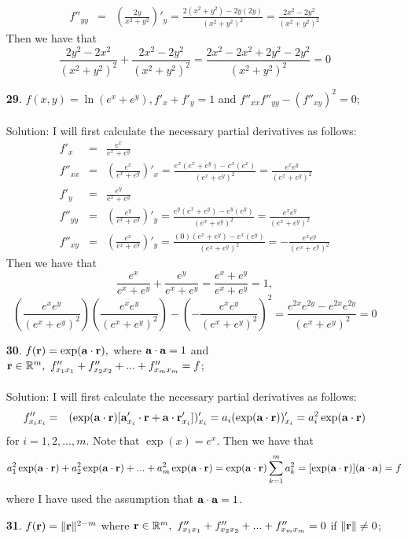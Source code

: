 \documentclass[12pt]{amsbook}
\begin{document}
\begin{enumerate}
\begin{eqnarray*}
f''_{yy}&=&(\frac{2y}{x^2+y^2})'_y=\frac{2(x^2+y^2)-2y(2y)}{(x^2+y^2)^2}=\frac{2x^2-2y^2}{(x^2+y^2)^2}
\end{eqnarray*}
Then we have that
$$\frac{2y^2-2x^2}{(x^2+y^2)^2}+\frac{2x^2-2y^2}{(x^2+y^2)^2}=\frac{2x^2-2x^2+2y^2-2y^2}{(x^2+y^2)^2}=0$$
\item[{\small\bf 29}.] $f(x,y)=\ln(e^x+e^y), f'_{x}+f'_{y}=1$ and $f''_{xx}f''_{yy}-(f''_{xy})^2=0$;
\\
\\
{\sc Solution}: I will first calculate the necessary partial derivatives as follows:
\begin{eqnarray*}
f'_{x}&=&\frac{e^x}{e^x+e^y} \\
f''_{xx}&=&(\frac{e^x}{e^x+e^y})'_x=\frac{e^x(e^x+e^y)-e^x(e^x)}{(e^x+e^y)^2}=\frac{e^xe^y}{(e^x+e^y)^2} \\
f'_{y}&=&\frac{e^y}{e^x+e^y} \\
f''_{yy}&=&(\frac{e^y}{e^x+e^y})'_y=\frac{e^y(e^x+e^y)-e^y(e^y)}{(e^x+e^y)^2}=\frac{e^xe^y}{(e^x+e^y)^2} \\
f''_{xy}&=&(\frac{e^x}{e^x+e^y})'_y=\frac{(0)(e^x+e^y)-e^x(e^y)}{(e^x+e^y)^2}=-\frac{e^xe^y}{(e^x+e^y)^2}
\end{eqnarray*}
Then we have that
$$\frac{e^x}{e^x+e^y}+\frac{e^y}{e^x+e^y}=\frac{e^x+e^y}{e^x+e^y}=1, $$
$$(\frac{e^xe^y}{(e^x+e^y)^2})(\frac{e^xe^y}{(e^x+e^y)^2})-(-\frac{e^xe^y}{(e^x+e^y)^2})^2=\frac{e^{2x}e^{2y}-e^{2x}e^{2y}}{(e^x+e^y)^2}=0$$
\item[{\small\bf 30}.] $f({\bf r})=\exp({\bf a}\cdot{\bf r}), $ where ${\bf a}\cdot{\bf a}=1$ and ${\bf r} \in \mathbb{R}^m, \ f''_{x_1x_1}+f''_{x_2x_2}+...+f''_{x_mx_m}=f$;
\\
\\
{\sc Solution}: I will first calculate the necessary partial derivatives as follows:
\begin{eqnarray*}
f''_{x_ix_i}&=&(\exp({\bf a}\cdot{\bf r})[{\bf a}'_{x_i}\cdot{\bf r}+{\bf a}\cdot{\bf r}'_{x_i}])'_{x_i}=a_i(\exp({\bf a}\cdot{\bf r}))'_{x_i}=a_i^2\exp({\bf a}\cdot{\bf r})
\end{eqnarray*}
for $i=1,2,...,m$. Note that $\exp(x)=e^x$. 
Then we have that
$$a_1^2\exp({\bf a}\cdot{\bf r})+a_2^2\exp({\bf a}\cdot{\bf r})+...+a_m^2\exp({\bf a}\cdot{\bf r})=\exp({\bf a}\cdot{\bf r})\sum_{k=1}^{m}a_k^2=[\exp({\bf a}\cdot{\bf r})]({\bf a}\cdot{\bf a})=f$$
where I have used the assumption that ${\bf a}\cdot{\bf a}=1$.
\\
\item[{\small\bf 31}.] $f({\bf r})=\|{\bf r}\|^{2-m}$ where ${\bf r}\in \mathbb{R}^m, \ f''_{x_1x_1}+f''_{x_2x_2}+...+f''_{x_mx_m}=0$ if $\|{\bf r}\| \neq 0$;

\end{enumerate}
\end{document}

